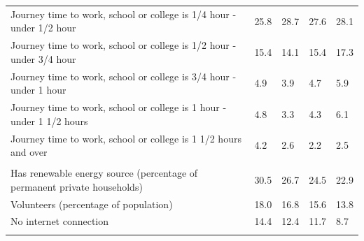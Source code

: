 \documentclass{article}
\begin{document}
\begin{table}[h]
\begin{tabular}{KTTTT}
Journey time to work, school or college is 1/4 hour - under 1/2 hour & 25.8& 28.7& 27.6& 28.1\\
Journey time to work, school or college is 1/2 hour - under 3/4 hour & 15.4& 14.1& 15.4& 17.3\\
Journey time to work, school or college is 3/4 hour - under 1 hour & 4.9& 3.9& 4.7& 5.9\\
Journey time to work, school or college is 1 hour - under 1 1/2 hours & 4.8& 3.3& 4.3& 6.1\\
Journey time to work, school or college is 1 1/2 hours and over & 4.2& 2.6& 2.2& 2.5\\
\hline
    \\ 
    \hline
Has renewable energy source (percentage of permanent private households) & 30.5& 26.7& 24.5& 22.9\\
    \hline
Volunteers (percentage of population) & 18.0& 16.8& 15.6& 13.8\\
    \hline
No internet connection& 14.4& 12.4& 11.7&  8.7\\
\hline
\end{tabular}
\end{table}
\end{document}
